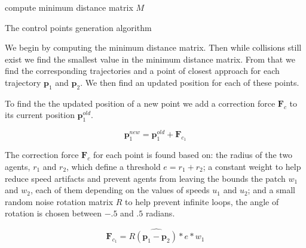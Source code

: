 \begin{algorithm}[t]
compute minimum distance matrix $M$\;
\caption{The control points generation algorithm}
\label{algo:control-points}
\end{algorithm}


We begin by computing the minimum distance matrix. Then while collisions still exist we find the smallest value in the minimum distance matrix. From that we find the corresponding trajectories and a point of closest approach for each trajectory $\mathbf{p}_1$ and $\mathbf{p}_2$. We then find an updated position for each of these points.

To find the the updated position of a new point we add a correction force $\mathbf{F}_c$ to its current position $\mathbf{p}_1^{old}$.


\begin{equation}
	\mathbf{p}_1^{new} = \mathbf{p}_1^{old} + \mathbf{F}_{c_1}
\end{equation}



The correction force $\mathbf{F}_c$ for each point is found based on: the radius of the two agents, $r_1$ and $r_2$, which define a threshold $e=r_1+r_2$; a constant weight to help reduce speed artifacts and prevent agents from leaving the bounds the patch $w_1$ and $w_2$, each of them depending on the values of speeds $u_1$ and $u_2$; and a small random noise rotation matrix $R$ to help prevent infinite loops, the angle of rotation is chosen between $-.5$ and $.5$ radians.

\begin{equation}
	 \mathbf{F}_{c_1}= R  \widehat{(\mathbf{p}_1 - \mathbf{p}_2)}* e * w_1
\end{equation}

